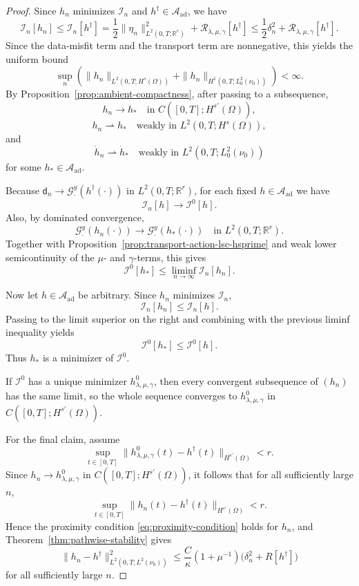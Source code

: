 \documentclass{article}
\theoremstyle{definition}
\newcommand{\obsdata}{\mathsf{d}}
\begin{document}
\begin{proof}
    Since \(h_n\) minimizes \(\mathcal I_n\) and \(h^\dagger\in\mathcal A_{\mathrm{ad}}\), we have
    \[
        \mathcal I_n[h_n]
        \le
        \mathcal I_n[h^\dagger]
        =
        \frac12\|\eta_n\|_{L^2(0,T;\mathbb R^r)}^2
        +
        \mathcal R_{\lambda,\mu,\gamma}[h^\dagger]
        \le
        \frac12\delta_n^2+\mathcal R_{\lambda,\mu,\gamma}[h^\dagger].
    \]
    Since the data-misfit term and the transport term are nonnegative, this yields the uniform bound
    \[
        \sup_n
        \left(
        \|h_n\|_{L^2(0,T;H^s(\Omega))}
        +
        \|h_n\|_{H^1(0,T;L^2_0(\nu_0))}
        \right)
        <\infty.
    \]
    By Proposition~\ref{prop:ambient-compactness}, after passing to a subsequence,
    \[
        h_n\to h_\ast
        \quad\text{in } C([0,T];H^{s'}(\Omega)),
    \]
    \[
        h_n\rightharpoonup h_\ast
        \quad\text{weakly in } L^2(0,T;H^s(\Omega)),
    \]
    and
    \[
        \dot h_n\rightharpoonup \dot h_\ast
        \quad\text{weakly in } L^2(0,T;L^2_0(\nu_0))
    \]
    for some \(h_\ast\in\mathcal A_{\mathrm{ad}}\).

    Because \(\obsdata_n\to \mathcal G_\cdot^y(h^\dagger(\cdot))\) in
    \(L^2(0,T;\mathbb R^r)\), for each fixed \(h\in\mathcal A_{\mathrm{ad}}\) we have
    \[
        \mathcal I_n[h]\to \mathcal I^0[h].
    \]
    Also, by dominated convergence,
    \[
        \mathcal G_\cdot^y(h_n(\cdot))\to \mathcal G_\cdot^y(h_\ast(\cdot))
        \quad\text{in } L^2(0,T;\mathbb R^r).
    \]
    Together with Proposition~\ref{prop:transport-action-lsc-hsprime} and weak lower semicontinuity of
    the \(\mu\)- and \(\gamma\)-terms, this gives
    \[
        \mathcal I^0[h_\ast]
        \le
        \liminf_{n\to\infty}\mathcal I_n[h_n].
    \]

    Now let \(h\in\mathcal A_{\mathrm{ad}}\) be arbitrary. Since \(h_n\) minimizes \(\mathcal I_n\),
    \[
        \mathcal I_n[h_n]\le \mathcal I_n[h].
    \]
    Passing to the limit superior on the right and combining with the previous liminf inequality yields
    \[
        \mathcal I^0[h_\ast]\le \mathcal I^0[h].
    \]
    Thus \(h_\ast\) is a minimizer of \(\mathcal I^0\).

    If \(\mathcal I^0\) has a unique minimizer \(h^0_{\lambda,\mu,\gamma}\), then every convergent
    subsequence of \((h_n)\) has the same limit, so the whole sequence converges to
    \(h^0_{\lambda,\mu,\gamma}\) in \(C([0,T];H^{s'}(\Omega))\).

    For the final claim, assume
    \[
        \sup_{t\in[0,T]}
        \|h^0_{\lambda,\mu,\gamma}(t)-h^\dagger(t)\|_{H^{s'}(\Omega)}<r.
    \]
    Since \(h_n\to h^0_{\lambda,\mu,\gamma}\) in \(C([0,T];H^{s'}(\Omega))\), it follows that for all
    sufficiently large \(n\),
    \[
        \sup_{t\in[0,T]}
        \|h_n(t)-h^\dagger(t)\|_{H^{s'}(\Omega)}<r.
    \]
    Hence the proximity condition \eqref{eq:proximity-condition} holds for \(h_n\), and
    Theorem~\ref{thm:pathwise-stability} gives
    \[
        \|h_n-h^\dagger\|_{L^2(0,T;L^2(\nu_0))}^2
        \le
        \frac{C}{\kappa}(1+\mu^{-1})
        \bigl(\delta_n^2+R[h^\dagger]\bigr)
    \]
    for all sufficiently large \(n\).
\end{proof}
\end{document}
